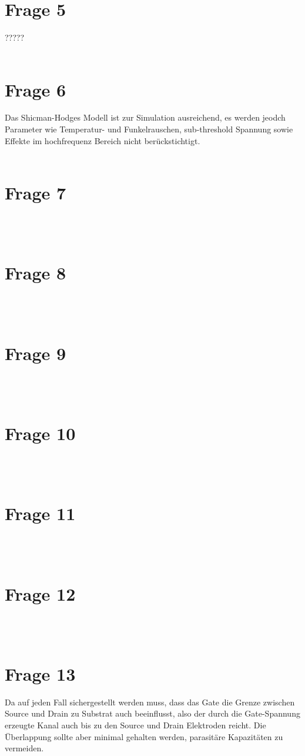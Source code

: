 \documentclass[a4paper]{scrartcl}
\begin{document}
\section*{Frage 5}
?????
~\\
~\\
\section*{Frage 6}
Das Shicman-Hodges Modell ist zur Simulation ausreichend, es werden jeodch Parameter wie Temperatur- und Funkelrauschen, sub-threshold Spannung sowie Effekte im hochfrequenz Bereich nicht berückstichtigt.
~\\
~\\
\section*{Frage 7}

~\\
~\\
\section*{Frage 8}

~\\
~\\
\section*{Frage 9}

~\\
~\\
\section*{Frage 10}

~\\
~\\
\section*{Frage 11}

~\\
~\\
\section*{Frage 12}

~\\
~\\
\section*{Frage 13}
Da auf jeden Fall sichergestellt werden muss, dass das Gate die Grenze zwischen Source und Drain zu Substrat auch beeinflusst, also der durch die Gate-Spannung erzeugte Kanal auch bis zu den Source und Drain Elektroden reicht. Die Überlappung sollte aber minimal gehalten werden, parasitäre Kapazitäten zu vermeiden.
~\\
~\\
\end{document}

